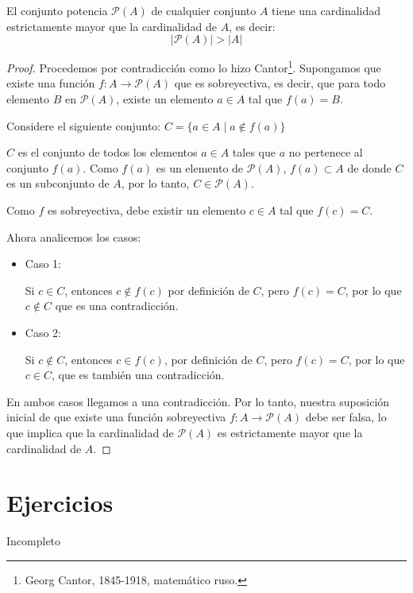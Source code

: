 \begin{fmd-theorem}
	El conjunto potencia $\mathcal{P}(A)$ de cualquier conjunto $A$ tiene una cardinalidad estrictamente mayor que la cardinalidad de $A$, es decir:
	\[ |\mathcal{P}(A)| >  |A| \]
	
	\begin{proof}
		Procedemos por contradicción como lo hizo Cantor\footnote{Georg Cantor, 1845-1918, matemático ruso.}. Supongamos que existe una función $f: A \rightarrow \mathcal{P}(A)$ que es sobreyectiva, es decir, que para todo elemento $B$ en $\mathcal{P}(A)$, existe un elemento $a \in A$ tal que $f(a) = B$.
		
		Considere el siguiente conjunto: $ C = \{ a \in A \mid a \not \in f(a) \} $
		
		$C$ es el conjunto de todos los elementos $a \in A$ tales que $a$ no pertenece al conjunto $f(a)$.
		Como $f(a)$ es un elemento de $\mathcal{P}(A)$, $f(a) \subset A$ de donde $C$ es un subconjunto de $A$, por lo tanto, $C \in \mathcal{P}(A)$.
		
		Como $f$ es sobreyectiva, debe existir un elemento $c \in A$ tal que $f(c) = C$.
		
		Ahora analicemos los casos:
		
		\begin{itemize}
			\item Caso 1:
			
			 Si $c \in C$, entonces $c \not \in f(c)$ por definición de $C$, pero $f(c) = C$, por lo que $c \not \in C$ que es una contradicción.
			\item Caso 2:
			
			Si $c \not \in C$, entonces $c \in f(c)$, por definición de $C$, pero $f(c) = C$, por lo que $c \in C$, que es también una contradicción.
		\end{itemize}
		En ambos casos llegamos a una contradicción. Por lo tanto, nuestra suposición inicial de que existe una función sobreyectiva $f: A \rightarrow \mathcal{P}(A)$ debe ser falsa, lo que implica que la cardinalidad de $\mathcal{P}(A)$ es estrictamente mayor que la cardinalidad de $A$.
	\end{proof}
\end{fmd-theorem}


\section{Ejercicios}

{ \color{red} Incompleto }

